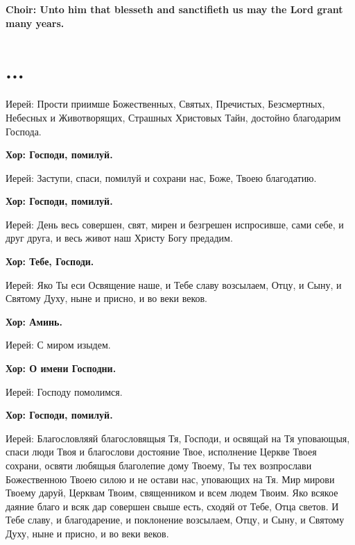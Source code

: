 \documentclass[12pt,a4paper,titlepage]{report}
\begin{document}
\begin{paracol}[1]{2}
    \textbf {Choir: Unto him that blesseth and sanctifieth us may the Lord grant many years.}

    \switchcolumn[1]

	\section*{...}

	Иерей: Прости приимше Божественных, Святых, Пречистых, Безсмертных, Небесных и Животворящих, Страшных Христовых Тайн, достойно благодарим Господа.
	
	\textbf{Хор: Господи, помилуй.}
	
	Иерей: Заступи, спаси, помилуй и сохрани нас, Боже, Твоею благодатию.
	
	\textbf{Хор: Господи, помилуй.}
	
	Иерей: День весь совершен, свят, мирен и безгрешен испросивше, сами себе, и друг друга, и весь живот наш Христу Богу предадим.
	
	\textbf{Хор: Тебе, Господи.}
	
	Иерей: Яко Ты еси Освящение наше, и Тебе славу возсылаем, Отцу, и Сыну, и Святому Духу, ныне и присно, и во веки веков.
	
	\textbf{Хор: Аминь.}
	
	Иерей: С миром изыдем.
	
	\textbf{Хор: О имени Господни.}
	
	Иерей: Господу помолимся.
	
	\textbf{Хор: Господи, помилуй.}
	
	Иерей: Благословляяй благословящыя Тя, Господи, и освящай на Тя уповающыя, спаси люди Твоя и благослови достояние Твое, исполнение Церкве Твоея сохрани, освяти любящыя благолепие дому Твоему, Ты тех возпрослави Божественною Твоею силою и не остави нас, уповающих на Тя. Мир мирови Твоему даруй, Церквам Твоим, священником и всем людем Твоим. Яко всякое даяние благо и всяк дар совершен свыше есть, сходяй от Тебе, Отца светов. И Тебе славу, и благодарение, и поклонение возсылаем, Отцу, и Сыну, и Святому Духу, ныне и присно, и во веки веков.
	

\end{paracol}
\end{document}
